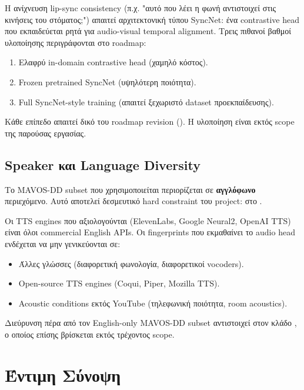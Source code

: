Η ανίχνευση lip-sync consistency
(π.χ. "αυτό που λέει η φωνή αντιστοιχεί στις κινήσεις του στόματος;")
απαιτεί αρχιτεκτονική τύπου SyncNet:
ένα contrastive head που εκπαιδεύεται ρητά
για audio-visual temporal alignment.
Τρεις πιθανοί βαθμοί υλοποίησης περιγράφονται στο roadmap:

\begin{enumerate}
  \item Ελαφρύ in-domain contrastive head (χαμηλό κόστος).
  \item Frozen pretrained SyncNet (υψηλότερη ποιότητα).
  \item Full SyncNet-style training (απαιτεί ξεχωριστό dataset προεκπαίδευσης).
\end{enumerate}

Κάθε επίπεδο απαιτεί δικό του roadmap revision
().
Η υλοποίηση είναι εκτός scope της παρούσας εργασίας.

\subsection{Speaker και Language Diversity}
\label{subsec:speaker-diversity}

Το MAVOS-DD subset που χρησιμοποιείται
περιορίζεται σε \textbf{αγγλόφωνο} περιεχόμενο.
Αυτό αποτελεί δεσμευτικό hard constraint του project:
 στο .

Οι TTS engines που αξιολογούνται
(ElevenLabs, Google Neural2, OpenAI TTS)
είναι όλοι commercial English APIs.
Οι fingerprints που εκμαθαίνει το audio head
ενδέχεται να μην γενικεύονται σε:
\begin{itemize}
  \item Άλλες γλώσσες (διαφορετική φωνολογία, διαφορετικοί vocoders).
  \item Open-source TTS engines (Coqui, Piper, Mozilla TTS).
  \item Acoustic conditions εκτός YouTube (τηλεφωνική ποιότητα, room acoustics).
\end{itemize}

Διεύρυνση πέρα από τον English-only MAVOS-DD subset
αντιστοιχεί στον κλάδο ,
ο οποίος επίσης βρίσκεται εκτός τρέχοντος scope.

\section{Έντιμη Σύνοψη}
\label{sec:honest-summary}

